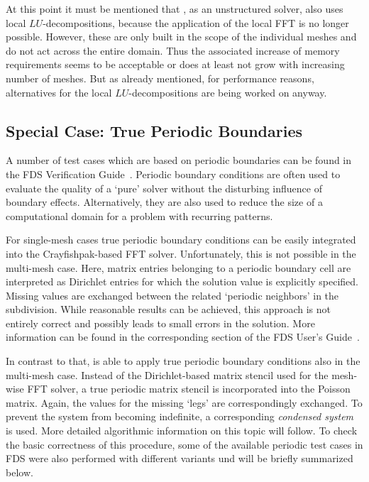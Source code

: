 At this point it must be mentioned that \uscarc{},  as an unstructured solver, also uses local $LU$-decompositions, because the application of the local FFT is no longer possible.
However, these are only built in the scope of the individual meshes and do not act across the entire domain. Thus the associated increase of memory requirements seems to be acceptable or does at least not grow with increasing number of meshes.
But as already mentioned, for performance reasons, alternatives for the local $LU$-decompositions are being worked on anyway.


\subsection{Special Case: True Periodic Boundaries}
\label{SEC_SCARC_periodic_boundaries}

A number of test cases which are based on periodic boundaries can be found in the FDS Verification Guide~\cite{McGrattan:2018:VG}. Periodic boundary conditions are often used to evaluate the quality of a `pure' solver without the disturbing influence of boundary effects. Alternatively, they are also used to reduce the size of a computational domain for a problem with recurring patterns.

For single-mesh cases true periodic boundary conditions can be easily integrated into the Crayfishpak-based FFT solver. Unfortunately, this is not possible in the multi-mesh case. Here, matrix entries belonging to a periodic boundary cell are interpreted as Dirichlet entries for which the solution value is explicitly specified. Missing values are exchanged between the related `periodic neighbors' in the subdivision. While reasonable results can be achieved, this approach is not entirely correct and possibly leads to small errors in the solution. More information can be found in the corresponding section of the FDS User's Guide~\cite{McGrattan:2018:UG}.

In contrast to that, \scarc{} is able to apply true periodic boundary conditions also in the multi-mesh case. Instead of the Dirichlet-based matrix stencil used for the mesh-wise FFT solver, a true periodic matrix stencil is incorporated into the Poisson matrix. Again, the values for the missing `legs' 
are correspondingly exchanged. 
To prevent the system from becoming indefinite, a corresponding {\it condensed system} is used. More detailed algorithmic information on this topic will follow.
To check the basic correctness of this procedure, some of the available periodic test cases in FDS were also performed with different \scarc{} variants und will be briefly summarized below.


